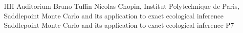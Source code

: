 \tablePlenary{} %
{HH Auditorium}	%
{Bruno Tuffin}		%
{Nicolas Chopin, Institut Polytechnique de Paris, Saddlepoint Monte Carlo and its application to exact ecological inference}	%
{Saddlepoint Monte Carlo and its application to exact ecological inference}		%
{P7}		%
\\\hline

